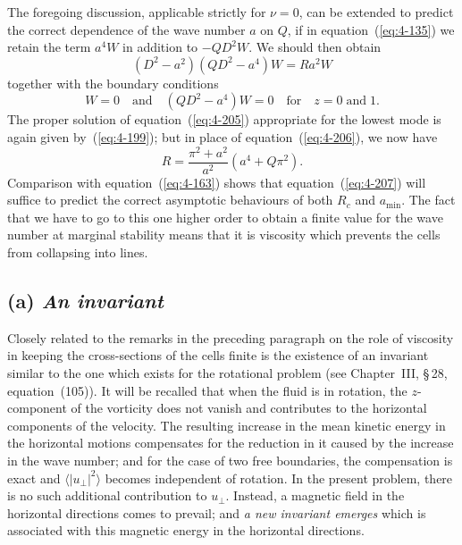 The foregoing discussion, applicable strictly for $\nu=0$, can be extended to predict the correct dependence of the wave number $a$ on $Q$, if in equation~(\ref{eq:4-135}) we retain the term $a^4 W$ in addition to $-QD^2 W$. We should then obtain
\begin{equation}
\label{eq:4-205}
(D^2-a^2)(QD^2-a^4)W = Ra^2 W
\end{equation}
together with the boundary conditions
\begin{equation}
\label{eq:4-206}
W = 0 \quad\text{and}\quad (QD^2-a^4)W = 0 \quad \text{for}\quad z = 0\;\text{and}\;1.
\end{equation}
The proper solution of equation~(\ref{eq:4-205}) appropriate for the lowest mode is again given by~(\ref{eq:4-199}); but in place of equation~(\ref{eq:4-206}), we now have
\begin{equation}
\label{eq:4-207}
R = \frac{\pi^2+a^2}{a^2}(a^4+Q\pi^2).
\end{equation}
Comparison with equation~(\ref{eq:4-163}) shows that equation~(\ref{eq:4-207}) will suffice to predict the correct asymptotic behaviours of both $R_c$ and $a_{\min}$. The fact that we have to go to this one higher order to obtain a finite value for the wave number at marginal stability means that it is viscosity which prevents the cells from collapsing into lines.

\subsection*{(a) \emph{An invariant}}

Closely related to the remarks in the preceding paragraph on the role of viscosity in keeping the cross-sections of the cells finite is the existence of an invariant similar to the one which exists for the rotational problem (see Chapter~III, \S\,28, equation~(105)). It will be recalled that when the fluid is in rotation, the $z$-component of the vorticity does not vanish and contributes to the horizontal components of the velocity. The resulting increase in the mean kinetic energy in the horizontal motions compensates for the reduction in it caused by the increase in the wave number; and for the case of two free boundaries, the compensation is exact and $\langle |u_\perp|^2\rangle$ becomes independent of rotation. In the present problem, there is no such additional contribution to $u_\perp$. Instead, a magnetic field in the horizontal directions comes to prevail; and \emph{a new invariant emerges} which is associated with this magnetic energy in the horizontal directions.

